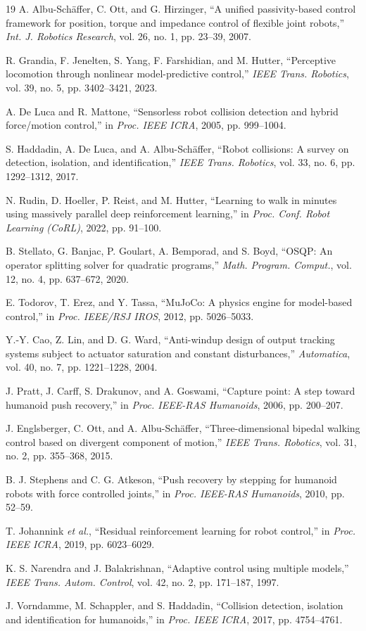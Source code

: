 \documentclass[journal]{IEEEtran}
\begin{document}
\begin{thebibliography}{19}
 A. Albu-Sch\"{a}ffer, C. Ott, and G. Hirzinger, ``A unified passivity-based control framework for position, torque and impedance control of flexible joint robots,'' \emph{Int. J. Robotics Research}, vol. 26, no. 1, pp. 23--39, 2007.

 R. Grandia, F. Jenelten, S. Yang, F. Farshidian, and M. Hutter, ``Perceptive locomotion through nonlinear model-predictive control,'' \emph{IEEE Trans. Robotics}, vol. 39, no. 5, pp. 3402--3421, 2023.

 A. De Luca and R. Mattone, ``Sensorless robot collision detection and hybrid force/motion control,'' in \emph{Proc. IEEE ICRA}, 2005, pp. 999--1004.

 S. Haddadin, A. De Luca, and A. Albu-Sch\"{a}ffer, ``Robot collisions: A survey on detection, isolation, and identification,'' \emph{IEEE Trans. Robotics}, vol. 33, no. 6, pp. 1292--1312, 2017.

 N. Rudin, D. Hoeller, P. Reist, and M. Hutter, ``Learning to walk in minutes using massively parallel deep reinforcement learning,'' in \emph{Proc. Conf. Robot Learning (CoRL)}, 2022, pp. 91--100.

 B. Stellato, G. Banjac, P. Goulart, A. Bemporad, and S. Boyd, ``OSQP: An operator splitting solver for quadratic programs,'' \emph{Math. Program. Comput.}, vol. 12, no. 4, pp. 637--672, 2020.

 E. Todorov, T. Erez, and Y. Tassa, ``MuJoCo: A physics engine for model-based control,'' in \emph{Proc. IEEE/RSJ IROS}, 2012, pp. 5026--5033.

 Y.-Y. Cao, Z. Lin, and D. G. Ward, ``Anti-windup design of output tracking systems subject to actuator saturation and constant disturbances,'' \emph{Automatica}, vol. 40, no. 7, pp. 1221--1228, 2004.

 J. Pratt, J. Carff, S. Drakunov, and A. Goswami, ``Capture point: A step toward humanoid push recovery,'' in \emph{Proc. IEEE-RAS Humanoids}, 2006, pp. 200--207.

 J. Englsberger, C. Ott, and A. Albu-Sch\"{a}ffer, ``Three-dimensional bipedal walking control based on divergent component of motion,'' \emph{IEEE Trans. Robotics}, vol. 31, no. 2, pp. 355--368, 2015.

 B. J. Stephens and C. G. Atkeson, ``Push recovery by stepping for humanoid robots with force controlled joints,'' in \emph{Proc. IEEE-RAS Humanoids}, 2010, pp. 52--59.

 T. Johannink \emph{et al.}, ``Residual reinforcement learning for robot control,'' in \emph{Proc. IEEE ICRA}, 2019, pp. 6023--6029.

 K. S. Narendra and J. Balakrishnan, ``Adaptive control using multiple models,'' \emph{IEEE Trans. Autom. Control}, vol. 42, no. 2, pp. 171--187, 1997.

 J. Vorndamme, M. Schappler, and S. Haddadin, ``Collision detection, isolation and identification for humanoids,'' in \emph{Proc. IEEE ICRA}, 2017, pp. 4754--4761.

\end{thebibliography}
\end{document}
